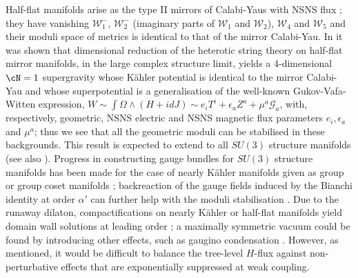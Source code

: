 \begin{itemize}
  Half-flat manifolds arise as the type II mirrors of Calabi-Yaus with NSNS flux \cite{Gurrieri:2004dt}; they have vanishing $\mathcal{W}_1^-$, $\mathcal{W}_2^-$ (imaginary parts of $\mathcal{W}_1$ and $\mathcal{W}_2$), $\mathcal{W}_4$ and $\mathcal{W}_5$ and their moduli space of metrics is identical to that of the mirror Calabi-Yau.  In \cite{Gurrieri:2004dt, Gurrieri:2007jg} it was shown that dimensional reduction of the heterotic string theory on half-flat mirror manifolds, in the large complex structure limit, yields a 4-dimensional $\cN=1$ supergravity whose K\"ahler potential is identical to the mirror Calabi-Yau and whose superpotential is a generalisation  of the well-known Gukov-Vafa-Witten expression, $W \sim \int \Omega \wedge (H+idJ) \sim e_i T^i + \epsilon_a Z^a + \mu^a \mathcal{G}_a$, with, respectively, geometric, NSNS electric and NSNS magnetic flux parameters $e_i, \epsilon_a$ and $\mu^a$; thus we see that all the geometric moduli can be stabilised in these backgrounds.  This result is expected to extend to all $SU(3)$ structure manifolds (see also \cite{LopesCardoso:2003dvb, Becker:2003sh}).  Progress in constructing gauge bundles for $SU(3)$ structure manifolds has been made for the case of nearly K\"ahler manifolds given as group or group coset manifolds \cite{Chatzistavrakidis:2009mh, Lechtenfeld:2010dr, Klaput:2011mz}; backreaction of the gauge fields induced by the Bianchi identity at order $\alpha'$ can further help with the moduli stabilisation \cite{Klaput:2012vv}.  Due to the runaway dilaton, compactifications on nearly K\"ahler or half-flat manifolds yield domain wall solutions at leading order \cite{Lukas:2010mf, Klaput:2011mz}; a maximally symmetric vacuum could be found by introducing other effects, such as gaugino condensation \cite{Klaput:2012vv}.  However, as mentioned, it would be difficult to balance the tree-level $H$-flux against non-perturbative effects that are exponentially suppressed at weak coupling. 
 

\end{itemize}

